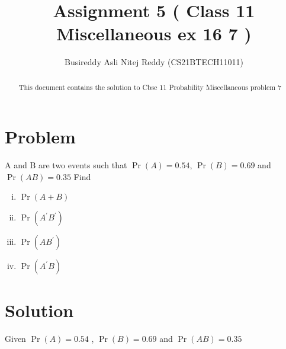 \documentclass[journal,12pt,twocolumn]{IEEEtran}
\title{Assignment 5 ( Class 11 Miscellaneous ex 16 7 )}
\author{Busireddy Asli Nitej Reddy (CS21BTECH11011)}
\date{}
\providecommand{\pr}[1]{\ensuremath{\Pr\left(#1\right)}}
\begin{document}
\maketitle



\begin{abstract}
This document contains the solution to Cbse 11  Probability Miscellaneous problem 7	
\end{abstract}



\section*{\textbf{Problem}}

 A and B are two events such that  $\pr{A} = 0.54$, $\pr{B} = 0.69$ and $\pr{A B} = 0.35$ Find
     \begin{enumerate}[i)]
         \item $\pr{A+B}$
         \item $\pr{A^{\prime} B^{\prime}}$
         \item $\pr{A B^{\prime}}$
         \item $\pr{A^{\prime} B}$
     \end{enumerate}



\section*{\textbf{Solution}}

Given  $\pr{A} = 0.54$ , $\pr{B} = 0.69$ and $\pr{A B} = 0.35$
\end{document}

